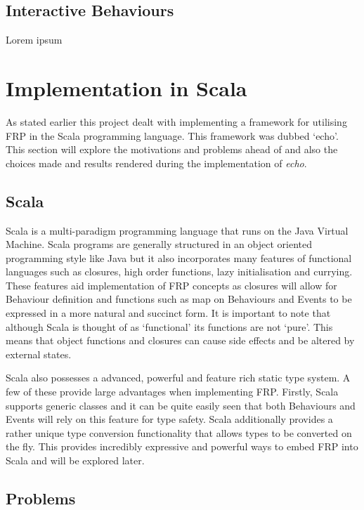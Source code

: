\documentclass[12pt]{article}
\begin{document}
    \subsection{Interactive Behaviours}
    Lorem ipsum
    
  \section{Implementation in Scala}
    As stated earlier this project dealt with implementing a framework for utilising FRP in the Scala programming
    language. This framework was dubbed `echo'. This section will explore the motivations and problems ahead of
    and also the choices made and results rendered during the implementation of \emph{echo}.
    
    \subsection{Scala}
      Scala is a multi-paradigm programming language that runs on the Java Virtual Machine. Scala programs are
      generally structured in an object oriented programming style like Java but it also incorporates many features of
      functional languages such as closures, high order functions, lazy initialisation and currying. These features aid
      implementation of FRP concepts as closures will allow for Behaviour definition and functions such as map on
      Behaviours and Events to be expressed in a more natural and succinct form. It is
      important to note that although Scala is thought of as `functional' its functions are not `pure'. This means
      that object functions and closures can cause side effects and be altered by external states.
      
      Scala also possesses a advanced, powerful and feature rich static type system. A few of these provide large
      advantages when implementing FRP. Firstly, Scala supports generic classes and it can be quite easily seen
      that both Behaviours and Events will rely on this feature for type safety. Scala additionally provides
      a rather unique type conversion functionality that allows types to be converted on the fly. This provides
      incredibly expressive and powerful ways to embed FRP into Scala and will be explored later.
      
    \subsection{Problems}
    
\end{document}
